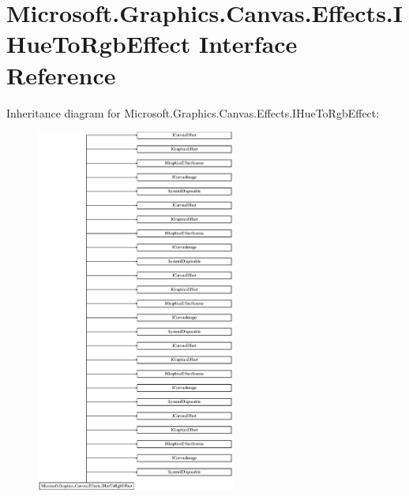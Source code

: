 \hypertarget{interface_microsoft_1_1_graphics_1_1_canvas_1_1_effects_1_1_i_hue_to_rgb_effect}{}\section{Microsoft.\+Graphics.\+Canvas.\+Effects.\+I\+Hue\+To\+Rgb\+Effect Interface Reference}
\label{interface_microsoft_1_1_graphics_1_1_canvas_1_1_effects_1_1_i_hue_to_rgb_effect}
Inheritance diagram for Microsoft.\+Graphics.\+Canvas.\+Effects.\+I\+Hue\+To\+Rgb\+Effect\+:\begin{figure}[H]
\begin{center}
\leavevmode
\includegraphics[height=12.000000cm]{interface_microsoft_1_1_graphics_1_1_canvas_1_1_effects_1_1_i_hue_to_rgb_effect}
\end{center}
\end{figure}
